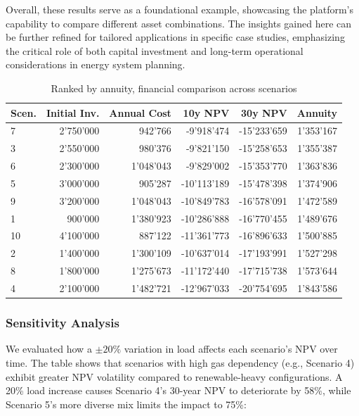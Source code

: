 Overall, these results serve as a foundational example, showcasing the platform's capability to compare
different asset combinations. The insights gained here can be further refined for tailored applications
in specific case studies, emphasizing the critical role of both capital investment and long-term 
operational considerations in energy system planning.

\begin{table}[h]
\centering
\begin{tabular}{l r r r r r}
\hline
\textbf{Scen.} & \textbf{Initial Inv.} & \textbf{Annual Cost} & \textbf{10y NPV} & \textbf{30y NPV} & \textbf{Annuity} \\
\hline
7 &  2'750'000 &  942'766 &  -9'918'474 &  -15'233'659 &  1'353'167 \\
3 &  2'550'000 &  980'376 &  -9'821'150 &  -15'258'653 &  1'355'387 \\
6 &  2'300'000 &  1'048'043 &  -9'829'002 &  -15'353'770 &  1'363'836 \\
5 &  3'000'000 &  905'287 &  -10'113'189 &  -15'478'398 &  1'374'906 \\
9 &  3'200'000 &  1'048'043 &  -10'849'783 &  -16'578'091 &  1'472'589 \\
1 &  900'000 &  1'380'923 &  -10'286'888 &  -16'770'455 &  1'489'676 \\
10 &  4'100'000 &  887'122 &  -11'361'773 &  -16'896'633 &  1'500'885 \\
2 &  1'400'000 &  1'300'109 &  -10'637'014 &  -17'193'991 &  1'527'298 \\
8 &  1'800'000 &  1'275'673 &  -11'172'440 &  -17'715'738 &  1'573'644 \\
4 &  2'100'000 &  1'482'721 &  -12'967'033 &  -20'754'695 &  1'843'586 \\
\hline
\end{tabular}
\caption{Ranked by annuity, financial comparison across scenarios}
\label{tab:financial_comparison}
\end{table}


\subsubsection{Sensitivity Analysis}

We evaluated how a \(\pm20\%\) variation in load affects each scenario's NPV over time. 
The table shows that scenarios with high gas dependency (e.g., Scenario 4) exhibit greater NPV 
volatility compared to renewable-heavy configurations. A 20\% load increase causes Scenario 4's 30-year NPV to deteriorate 
by 58\%, while Scenario 5's more diverse mix limits the impact to 75\%:

